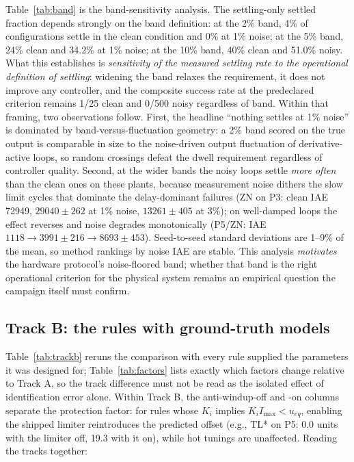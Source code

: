 \documentclass[10pt,twocolumn]{article}
\begin{document}
Table~\ref{tab:band} is the band-sensitivity analysis. The settling-only settled fraction depends strongly on the band definition: at the 2\% band, 4\% of configurations settle in the clean condition and 0\% at 1\% noise; at the 5\% band, 24\% clean and 34.2\% at 1\% noise; at the 10\% band, 40\% clean and 51.0\% noisy. What this establishes is \emph{sensitivity of the measured settling rate to the operational definition of settling}: widening the band relaxes the requirement, it does not improve any controller, and the composite success rate at the predeclared criterion remains 1/25 clean and 0/500 noisy regardless of band. Within that framing, two observations follow. First, the headline ``nothing settles at 1\% noise'' is dominated by band-versus-fluctuation geometry: a 2\% band scored on the true output is comparable in size to the noise-driven output fluctuation of derivative-active loops, so random crossings defeat the dwell requirement regardless of controller quality. Second, at the wider bands the noisy loops settle \emph{more often} than the clean ones on these plants, because measurement noise dithers the slow limit cycles that dominate the delay-dominant failures (ZN on P3: clean IAE 72949, $29040 \pm 262$ at 1\% noise, $13261 \pm 405$ at 3\%); on well-damped loops the effect reverses and noise degrades monotonically (P5/ZN: IAE $1118 \to 3991 \pm 216 \to 8693 \pm 453$). Seed-to-seed standard deviations are 1--9\% of the mean, so method rankings by noise IAE are stable. This analysis \emph{motivates} the hardware protocol's noise-floored band; whether that band is the right operational criterion for the physical system remains an empirical question the campaign itself must confirm.

\begin{table}[t]
\centering
\caption{Settling-band sensitivity: \emph{settling-only} fraction of the 25 Track A configurations (mean, min, max), by band width and condition. These rates are distinct from the composite success rate, which is reported in the text and is band-independent at its predeclared 2\% criterion.}
\label{tab:band}
\small
\setlength{\tabcolsep}{4pt}

\end{table}

\subsection{Track B: the rules with ground-truth models}
\label{sec:trackb}

Table~\ref{tab:trackb} reruns the comparison with every rule supplied the parameters it was designed for; Table~\ref{tab:factors} lists exactly which factors change relative to Track A, so the track difference must not be read as the isolated effect of identification error alone. Within Track B, the anti-windup-off and -on columns separate the protection factor: for rules whose $K_i$ implies $K_i I_{\max} < u_{eq}$, enabling the shipped limiter reintroduces the predicted offset (e.g., TL* on P5: 0.0 units with the limiter off, 19.3 with it on), while hot tunings are unaffected. Reading the tracks together:
\end{document}
